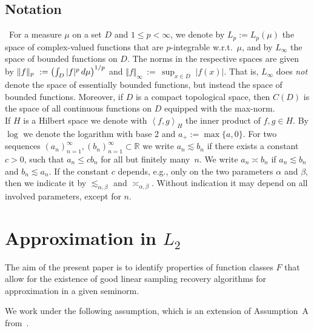 \documentclass[a4paper,12pt]{amsart}
\theoremstyle{definition}
\theoremstyle{remark}
\newcommand{\ipr}[2]{\left\langle#1,#2\right\rangle}
\begin{document}
\subsection{Notation} \
For a measure $\mu$ on a set $D$ {and} $1\le p<\infty$, 
we denote by $L_p{:=}L_p(\mu)$  
the space of complex-valued functions that are 
$p$-integrable w.r.t.\ $\mu$, 
and by $L_\infty$ the space of bounded functions on $D$.
The norms in the respective spaces are given by 
$\Vert f \Vert_p \ := \left(\int_{D} |f|^p\,{\rm d}\mu\right)^{1/p}$ 
and $\Vert f \Vert_\infty \,:=\, 
\sup_{x\in D}\; |f(x)|$. 
{That is, $L_\infty$ does \emph{not} denote the space of essentially bounded functions, but instead the space of bounded functions.}
Moreover, 
if $D$ is a {compact} 
topological space, then $C(D)$ is the space of all continuous functions on $D$ {equipped with the max-norm}.  \\
If $H$ is a Hilbert space we denote with $\ipr{f}{g}_H$ the inner product of $f,g \in H$. By $\log$ we denote the logarithm with base 2 and $a_+ := \max \{a, 0 \}$.
For two sequences
$(a_n)_{n=1}^{\infty},(b_n)_{n=1}^{\infty}\subset \mathbb{R}$ we write 
$a_n \lesssim b_n$ if there exists a constant $c>0$,
such that $a_n \leq cb_n$ for all {but finitely many}~$n$. 
We write $a_n \asymp b_n$ if $a_n \lesssim b_n$ and $b_n \lesssim a_n$.
If the constant $c$ depends, 
 {e.g.}, only on the two parameters $\alpha$ and $\beta$, 
then we indicate it by $\lesssim_{\alpha, \beta}$ and $\asymp_{\alpha, \beta}$.
Without indication it may depend on all involved parameters, except for $n$.



\section{Approximation in $L_2$}\label{sec:L2}

The aim of the present paper is to identify properties of function classes $F$ that allow for the existence of good linear sampling recovery 
algorithms for 
approximation in a given seminorm. 

We work under the following assumption, which is an extension of Assumption~A from~\cite{DKU}.

\hypertarget{assum}{}
\end{document}
